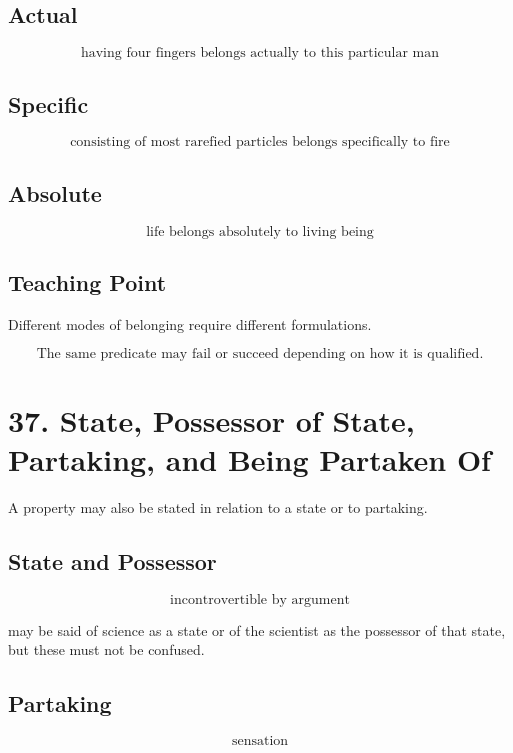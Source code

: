 \documentclass[12pt]{article}
\begin{document}
\subsection*{Actual}

\[
\text{having four fingers belongs actually to this particular man}
\]

\subsection*{Specific}

\[
\text{consisting of most rarefied particles belongs specifically to fire}
\]

\subsection*{Absolute}

\[
\text{life belongs absolutely to living being}
\]

\subsection*{Teaching Point}

Different modes of belonging require different formulations.

\[
\boxed{
\text{The same predicate may fail or succeed depending on how it is qualified.}
}
\]

\section*{37. State, Possessor of State, Partaking, and Being Partaken Of}

A property may also be stated in relation to a state or to partaking.

\subsection*{State and Possessor}

\[
\text{incontrovertible by argument}
\]

may be said of science as a state or of the scientist as the possessor of that
state, but these must not be confused.

\subsection*{Partaking}

\[
\text{sensation}
\]
\end{document}
